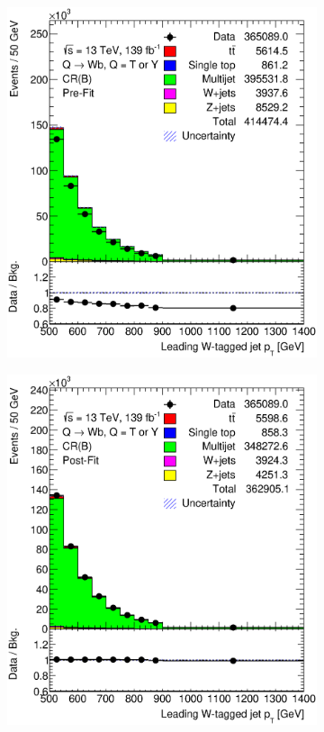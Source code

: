 \begin{figure}[hbt!]
\begin{subfigure}{.35\textwidth}
		\caption{}
	\end{subfigure}
	\begin{subfigure}{.35\textwidth}
		\centering
		\includegraphics[width=\linewidth,height=\textheight,keepaspectratio]{CR_B_ljet_pt.eps}
		\caption{}
	\end{subfigure}\hspace{0.6cm}
	\begin{subfigure}{.35\textwidth}
		\centering
		\includegraphics[width=\linewidth,height=\textheight,keepaspectratio]{CR_B_ljet_pt_postFit.eps}

\end{subfigure}
\end{figure}
